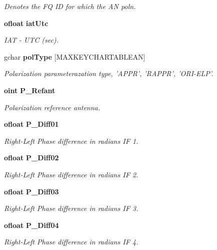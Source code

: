 \begin{CompactItemize}
\begin{CompactList}\small\item\em Denotes the FQ ID for which the AN poln. \item\end{CompactList}\item 
{\bf ofloat} {\bf iat\-Utc}
\begin{CompactList}\small\item\em IAT - UTC (sec). \item\end{CompactList}\item 
gchar {\bf pol\-Type} [MAXKEYCHARTABLEAN]
\begin{CompactList}\small\item\em Polarization parameterazation type, 'APPR', 'RAPPR', 'ORI-ELP'. \item\end{CompactList}\item 
{\bf oint} {\bf P\_\-Refant}
\begin{CompactList}\small\item\em Polarization reference antenna. \item\end{CompactList}\item 
{\bf ofloat} {\bf P\_\-Diff01}
\begin{CompactList}\small\item\em Right-Left Phase difference in radians IF 1. \item\end{CompactList}\item 
{\bf ofloat} {\bf P\_\-Diff02}
\begin{CompactList}\small\item\em Right-Left Phase difference in radians IF 2. \item\end{CompactList}\item 
{\bf ofloat} {\bf P\_\-Diff03}
\begin{CompactList}\small\item\em Right-Left Phase difference in radians IF 3. \item\end{CompactList}\item 
{\bf ofloat} {\bf P\_\-Diff04}
\begin{CompactList}\small\item\em Right-Left Phase difference in radians IF 4. \item\end{CompactList}\item 

\end{CompactItemize}
